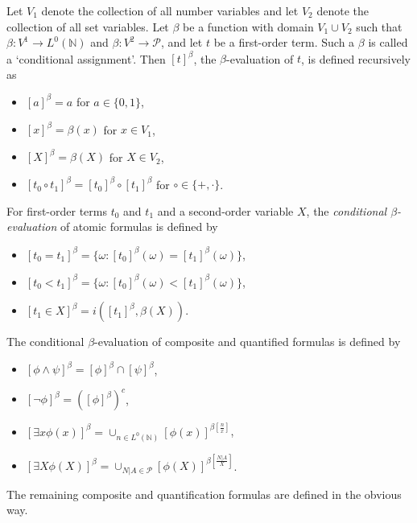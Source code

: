 \documentclass{jloganal}
\numberwithin{equation}{section}
\theoremstyle{plain}
\begin{document}
Let $V_1$ denote the collection of all number variables and let $V_2$ denote the collection of all set variables.  
Let $\beta$ be a function with domain $V_1\cup V_2$ such that $\beta:V^1\rightarrow L^0(\mathbb{N})$ and $\beta:V^{2}\rightarrow\mathcal{P}$, and let $t$ be a first-order term. 
Such a $\beta$ is called a `conditional assignment'.
Then $[t]^{\beta}$, the $\beta$-evaluation of $t$, is defined recursively as 
\begin{itemize}
\item $[a]^{\beta}=a$ for $a\in\{0,1\}$, 
\item $[x]^{\beta}=\beta(x)$ for $x\in V_1$, 
\item $[X]^{\beta}=\beta(X)$ for $X\in V_2$, 
\item $[t_{0}\circ t_{1}]^{ \beta}=[t_{0}]^{ \beta}\circ[t_{1}]^{ \beta}$ for $\circ\in\{+,\cdot\}$. 
\end{itemize}
For first-order terms $t_0$ and $t_1$ and a second-order variable $X$, the \emph{conditional $\beta$-evaluation} of atomic formulas is defined by
\begin{itemize}
\item $[t_0=t_1]^{ \beta}=\{\omega\colon  [t_0]^{\beta}(\omega)=[t_1]^{\beta}(\omega)\}$,  
\item $[t_0<t_1]^{ \beta}=\{\omega\colon  [t_0]^{\beta}(\omega)<[t_1]^{\beta}(\omega)\}$, 
\item $[t_1\in X]^{ \beta}=i([t_1]^{\beta}, \beta(X))$.    
\end{itemize}
The conditional $\beta$-evaluation of composite and quantified formulas is defined by 
\begin{itemize}
\item $[\phi\wedge \psi]^{ \beta}=[\phi]^{ \beta}\cap [\psi]^{ \beta}$, 
\item $[\neg \phi ]^{ \beta}=([\phi]^{ \beta})^c$, 
\item $[\exists x \phi(x)]^{ \beta}=\cup_{n\in L^0(\mathbb{N})} [\phi(x)]^{ \beta[\frac{n}{x}]}$,  
\item $[\exists X \phi(X)]^{ \beta}=\cup_{N|A \in \mathcal{P}} [\phi(X)]^{ \beta[\frac{N|A}{X}]}$. 
\end{itemize}
The remaining composite and quantification formulas are defined in the obvious way. 
\end{document}
